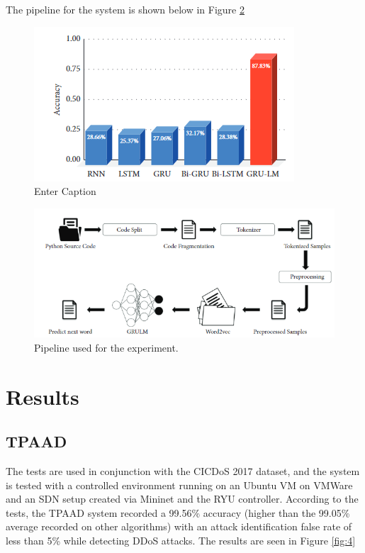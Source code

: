 \documentclass[a4paper, 12pt]{article}
\begin{document}
The pipeline for the system is shown below in Figure \ref{fig:3}

\begin{figure}[H]
    \centering
    \includegraphics[width=0.75\linewidth]{image.png}
    \caption{Enter Caption}
    \label{fig:grus}
\end{figure}

\begin{figure}[H]
    \centering
    \includegraphics[width=0.7\linewidth]{image-pipe.png}
    \caption{Pipeline used for the experiment. \protect{}}
    \label{fig:3}
\end{figure}

\clearpage

\section{Results}

\subsection{TPAAD} 
The tests are used in conjunction with the CICDoS 2017 dataset, and the system is tested with a controlled environment running on an Ubuntu VM on VMWare and an SDN setup created via Mininet and the RYU controller. According to the tests, the TPAAD system recorded a 99.56\% accuracy (higher than the 99.05\% average recorded on other algorithms) with an attack identification false rate of less than 5\% while detecting DDoS attacks. The results are seen in Figure \ref{fig:4} 
\end{document}
